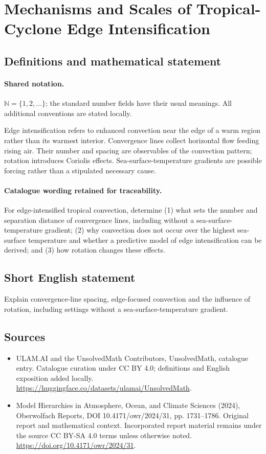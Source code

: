 \documentclass[11pt]{article}
\begin{document}
\section{Mechanisms and Scales of Tropical-Cyclone Edge Intensification}\label{statement}

\subsection{Definitions and mathematical statement}

\paragraph{Shared notation.}$\mathbb N=\{1,2,\ldots\}$; the standard number fields have their usual meanings. All additional conventions are stated locally.


Edge intensification refers to enhanced convection near the edge of a warm region rather than its warmest interior. Convergence lines collect horizontal flow feeding rising air. Their number and spacing are observables of the convection pattern; rotation introduces Coriolis effects. Sea-surface-temperature gradients are possible forcing rather than a stipulated necessary cause.

\paragraph{Catalogue wording retained for traceability.}
For edge-intensified tropical convection, determine (1) what sets the number and separation distance of convergence lines, including without a sea-surface-temperature gradient; (2) why convection does not occur over the highest sea-surface temperature and whether a predictive model of edge intensification can be derived; and (3) how rotation changes these effects.
\subsection{Short English statement}
Explain convergence-line spacing, edge-focused convection and the influence of rotation, including settings without a sea-surface-temperature gradient.
\subsection{Sources}
\begin{itemize}
\item[\hypertarget{source:statement:1}{S1}] ULAM.AI and the UnsolvedMath Contributors, UnsolvedMath, catalogue entry. Catalogue curation under CC BY 4.0; definitions and English exposition added locally.
\url{https://huggingface.co/datasets/ulamai/UnsolvedMath}.
\item[\hypertarget{source:statement:2}{S2}] Model Hierarchies in Atmosphere, Ocean, and Climate Sciences (2024), Oberwolfach Reports, DOI 10.4171/owr/2024/31, pp. 1731--1786. Original report and mathematical context. Incorporated report material remains under the source CC BY-SA 4.0 terms unless otherwise noted.
\url{https://doi.org/10.4171/owr/2024/31}.
\end{itemize}
\label{end:statement}
\end{document}
